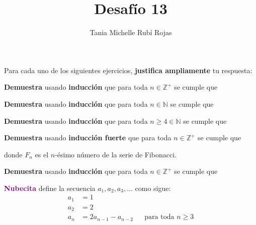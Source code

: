 \documentclass[oneside]{style}
\title{Desafío 13}
\author{Tania Michelle Rubí Rojas}
\begin{document}
\maketitle

Para cada uno de los siguientes ejercicios, \textbf{justifica ampliamente} tu 
respuesta:

\begin{questions}[label=\protect\circled{\bfseries\arabic*}]
    \question
    {
        \textbf{Demuestra} usando \textbf{inducción} que para toda 
        $n \in \mathbb{Z}^+$ se cumple que
        \begin{center}
        \end{center}
    }

    \question
    {
        \textbf{Demuestra} usando \textbf{inducción} que para toda 
        $n \in \mathbb{N}$ se cumple que
        \begin{center}
        \end{center}
    }

    \question
    {
        \textbf{Demuestra} usando \textbf{inducción} que para toda 
        $n \geq 4 \in \mathbb{N}$ se cumple que
        \begin{center}
        \end{center}
    }

    \question
    {
        \textbf{Demuestra} usando \textbf{inducción fuerte} que para toda 
        $n \in \mathbb{Z}^+$ se cumple que
        \begin{center}
        \end{center}

        donde $F_n$ es el $n$-ésimo número de la serie de Fibonacci. 
    }

    \question
    {
        \textbf{Demuestra} usando \textbf{inducción} que para toda 
        $n \in \mathbb{Z}^+$ se cumple que
        \begin{center}
        \end{center}
    }

    \question
    {
        \textcolor{purple}{\textbf{Nubecita}} define la secuencia $a_1, a_2, 
        a_3, \ldots$ como sigue:
        \begin{align*}
            a_1 &= 1 \\ 
            a_2 &= 2 \\ 
            a_n &= 2a_{n-1} - a_{n-2} 
            && \text{para toda } n \geq 3
        \end{align*}

}
\end{questions}
\end{document}
